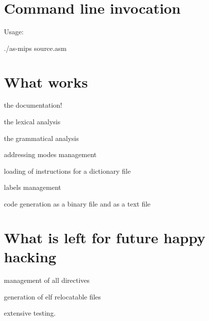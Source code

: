 \hypertarget{index_sec0}{}\section{Command line invocation}\label{index_sec0}
Usage\-: \par
 \par
 ./as-\/mips source.\-asm\hypertarget{index_sec3}{}\section{What works}\label{index_sec3}

\begin{DoxyItemize}
\item the documentation! \par

\item the lexical analysis \par

\item the grammatical analysis \par

\item addressing modes management \par

\item loading of instructions for a dictionary file \par

\item labels management \par

\item code generation as a binary file and as a text file \par

\end{DoxyItemize}\hypertarget{index_sec4}{}\section{What is left for future happy hacking}\label{index_sec4}

\begin{DoxyItemize}
\item management of all directives \par

\item generation of elf relocatable files \par

\item extensive testing. 
\end{DoxyItemize}